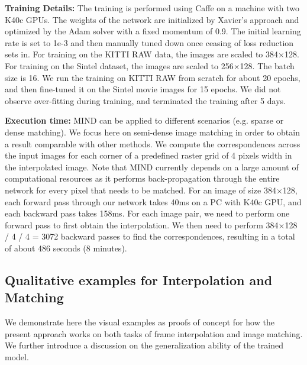 \documentclass[runningheads]{llncs}
\begin{document}
	\vspace{+0.1cm}			
	\noindent\textbf{Training Details:} The training is performed using Caffe \cite{jia2014caffe} on a machine with two K40c GPUs. The weights of the network are initialized by Xavier's approach \cite{glorot2010understanding} and optimized by the Adam solver \cite{kingma2014adam} with a fixed momentum of 0.9. The initial learning rate is set to 1e-3 and then manually tuned down once ceasing of loss reduction sets in. For training on the KITTI RAW data, the images are scaled to 384$\times$128. For training on the Sintel dataset, the images are scaled to 256$\times$128. The batch size is 16. We run the training on KITTI RAW from scratch for about 20 epochs, and then fine-tuned it on the Sintel movie images for 15 epochs. We did not observe over-fitting during training, and terminated the training after 5 days.
	
	\vspace{+0.1cm}
	\noindent\textbf{Execution time:} MIND can be applied to different scenarios (e.g. sparse or dense matching). We focus here on semi-dense image matching in order to obtain a result comparable with other methods. We compute the correspondences across the input images for each corner of a predefined raster grid of 4 pixels width in the interpolated image. Note that MIND currently depends on a large amount of computational resources as it performs back-propagation through the entire network for every pixel that needs to be matched. For an image of size 384$\times$128, each forward pass through our network takes 40ms on a PC with K40c GPU, and each backward pass takes 158ms. For each image pair, we need to perform one forward pass to first obtain the interpolation. We then need to perform 384$\times$128 / 4 / 4 = 3072 backward passes to find the correspondences, resulting in a total of about 486 seconds (8 minutes).

	\subsection{Qualitative examples for Interpolation and Matching}
	\label{sec:examples}
	
	We demonstrate here the visual examples as proofs of concept for how the present approach works on both tasks of frame interpolation and image matching. We further introduce a discussion on the generalization ability of the trained model.
	
\end{document}
